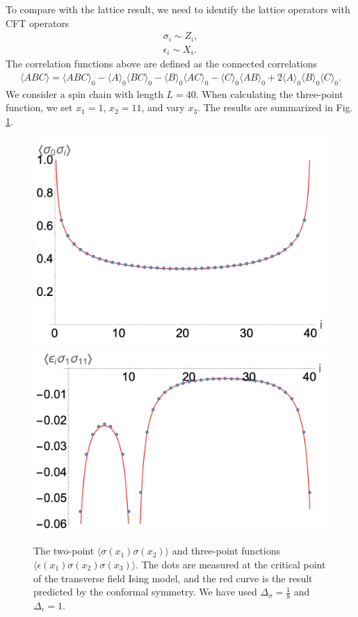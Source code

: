 \documentclass[prb,twocolumn,11pt]{revtex4-1}
\begin{document}
To compare with the lattice result, we need to identify the lattice operators with CFT operators
\begin{align}
    \sigma_i \sim Z_i,\nonumber\\
    \epsilon_i \sim X_i.
\end{align}
The correlation functions above are defined as the connected correlations
\begin{align}
    \langle ABC\rangle= \langle ABC\rangle_0-\langle A\rangle_0\langle BC\rangle_0-\langle B\rangle_0\langle AC\rangle_0-\langle C\rangle_0\langle AB\rangle_0+2 \langle A\rangle_0\langle B\rangle_0 \langle C\rangle_0.
\end{align}
We consider a spin chain with length $L=40$. When calculating the three-point function, we set $x_1=1$, $x_2=11$, and vary $x_3$.
The results are summarized in Fig. \ref{correlations}. 
\begin{figure}[htbp]
\centering
\includegraphics[scale=0.3]{ss2ptIsing.png}
\includegraphics[scale=0.3]{sse3ptIsing.png}
\caption{The two-point $\langle\sigma(x_1)\sigma(x_2)\rangle$ and three-point functions $\langle\epsilon(x_1)\sigma(x_2)\sigma(x_3)\rangle$. The dots are measured at the critical point of the transverse field Ising model, and the red curve is the result predicted by the conformal symmetry. We have used $\Delta_\sigma=\frac{1}{8}$ and $\Delta_{\epsilon}=1$.}
\label{correlations}
\end{figure}
\end{document}

